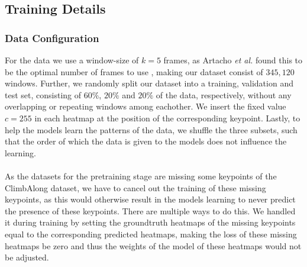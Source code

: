 \documentclass[./main.tex]{subfiles}
\begin{document}
\subsection{Training Details}
\label{subsubsec:training_details}
\subsubsection{Data Configuration} For the data we use a window-size of $k = 5$ frames, as Artacho \textit{et al.} found this to be the optimal number of frames to use \cite{https://doi.org/10.48550/arxiv.2001.08095}, making our dataset consist of $345,120$ windows. Further, we randomly split our dataset into a training, validation and test set, consisting of $60\%$, $20\%$ and $20\%$ of the data, respectively, without any overlapping or repeating windows among eachother. We insert the fixed value $c = 255$ in each heatmap at the position of the corresponding keypoint. Lastly, to help the models learn the patterns of the data, we shuffle the three subsets, such that the order of which the data is given to the models does not influence the learning.
\\
\\
As the datasets for the pretraining stage are missing some keypoints of the ClimbAlong dataset, we have to cancel out the training of these missing keypoints, as this would otherwise result in the models learning to never predict the presence of these keypoints. There are multiple ways to do this. We handled it during training by setting the groundtruth heatmaps of the missing keypoints equal to the corresponding predicted heatmaps, making the loss of these missing heatmaps be zero and thus the weights of the model of these heatmaps would not be adjusted. 
\end{document}
